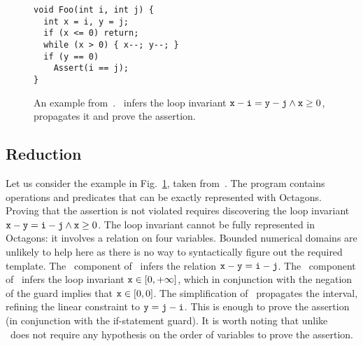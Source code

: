 \documentclass[sttt]{svjour}
\begin{document}
\begin{figure}%
\small
\begin{minipage}{5.5cm}
\begin{Verbatim}
void Foo(int i, int j) {
  int x = i, y = j;
  if (x <= 0) return;
  while (x > 0) { x--; y--; }
  if (y == 0) 
    Assert(i == j); 
}
\end{Verbatim}
\end{minipage}
\caption{\small An example from~\cite{SankaranarayananEtAl07}. \Subpoly\ infers the loop invariant $\mathtt{x} - \mathtt{i} = \mathtt{y} - \mathtt{j} \wedge \mathtt{x} \geq 0$, propagates it and prove the assertion.}
\label{fig:ex_paperSriramNEC}
\end{figure}

\subsection{Reduction}
Let us consider the example in Fig.~\ref{fig:ex_paperSriramNEC}, taken from~\cite{SankaranarayananEtAl07}.
The program contains operations and predicates that can be exactly represented with Octagons.
Proving that the assertion is not violated requires discovering the loop invariant $\mathtt{x} - \mathtt{y}  = \mathtt{i} - \mathtt{j} \wedge \mathtt{x} \geq 0$.
The loop invariant cannot be fully represented in Octagons: it involves a relation on four variables.
Bounded numerical domains are unlikely to help here as there is no way to syntactically figure out the required template. 
The \LinEq\ component of \SubPoly\ infers the relation $\mathtt{x} - \mathtt{y}  =  \mathtt{i} - \mathtt{j}$. 
The \Intervals\ component of \SubPoly\ infers the loop invariant $\mathtt{x} \in [0, +\infty]$, which in conjunction with the negation of the guard implies that $\mathtt{x} \in [0, 0]$.
The simplification of \SubPoly\ propagates the interval, refining the linear constraint to $\mathtt{y} = \mathtt{j} - \mathtt{i}$.
This is enough to prove the assertion (in conjunction with the if-statement guard).
It is worth noting that unlike~\cite{SankaranarayananEtAl07} \Subpoly\ does not require any hypothesis on the order of variables to prove the assertion.
\end{document}

